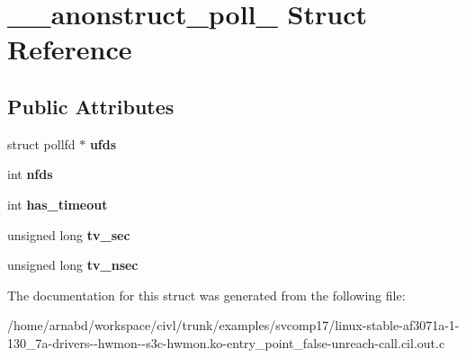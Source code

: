 \hypertarget{struct____anonstruct__poll__11}{}\section{\+\_\+\+\_\+anonstruct\+\_\+poll\+\_ Struct Reference}
\label{struct____anonstruct__poll__11}
\subsection*{Public Attributes}
\begin{DoxyCompactItemize}
\item 
\hypertarget{struct____anonstruct__poll__11_a3fa6e8a88fea5277ceb9e5dd9eec7267}{}struct pollfd $\ast$ {\bfseries ufds}\label{struct____anonstruct__poll__11_a3fa6e8a88fea5277ceb9e5dd9eec7267}

\item 
\hypertarget{struct____anonstruct__poll__11_a625e7ca73231791f4b123760c2c01837}{}int {\bfseries nfds}\label{struct____anonstruct__poll__11_a625e7ca73231791f4b123760c2c01837}

\item 
\hypertarget{struct____anonstruct__poll__11_ae6782ab6e6c82cd4b25af4df53a69123}{}int {\bfseries has\+\_\+timeout}\label{struct____anonstruct__poll__11_ae6782ab6e6c82cd4b25af4df53a69123}

\item 
\hypertarget{struct____anonstruct__poll__11_a98843215a417bd50942b31ef0fa8abe1}{}unsigned long {\bfseries tv\+\_\+sec}\label{struct____anonstruct__poll__11_a98843215a417bd50942b31ef0fa8abe1}

\item 
\hypertarget{struct____anonstruct__poll__11_a2404aa6da9c9bb4ed1fab9f896d6bcb7}{}unsigned long {\bfseries tv\+\_\+nsec}\label{struct____anonstruct__poll__11_a2404aa6da9c9bb4ed1fab9f896d6bcb7}

\end{DoxyCompactItemize}


The documentation for this struct was generated from the following file\+:\begin{DoxyCompactItemize}
\item 
/home/arnabd/workspace/civl/trunk/examples/svcomp17/linux-\/stable-\/af3071a-\/1-\/130\+\_\+7a-\/drivers-\/-\/hwmon-\/-\/s3c-\/hwmon.\+ko-\/entry\+\_\+point\+\_\+false-\/unreach-\/call.\+cil.\+out.\+c\end{DoxyCompactItemize}
